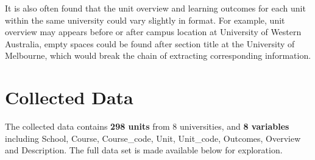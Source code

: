 \documentclass[
  letterpaper,
  DIV=11,
  numbers=noendperiod]{scrreport}
\begin{document}
It is also often found that the unit overview and learning outcomes for
each unit within the same university could vary slightly in format. For
example, unit overview may appears before or after campus location at
University of Western Australia, empty spaces could be found after
section title at the University of Melbourne, which would break the
chain of extracting corresponding information.

\hypertarget{collected-data}{%
\section{Collected Data}\label{collected-data}}

The collected data contains \textbf{298 units} from 8 universities, and
\textbf{8 variables} including School, Course, Course\_code, Unit,
Unit\_code, Outcomes, Overview and Description. The full data set is
made available below for exploration.
\end{document}

